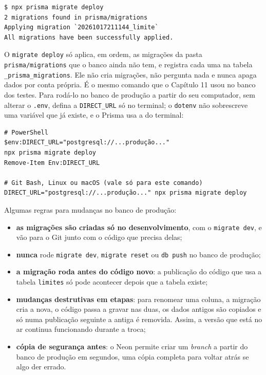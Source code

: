 \begin{codigo}
\begin{Verbatim}[breaklines=true, breaksymbolleft={}, fontsize=\footnotesize]
$ npx prisma migrate deploy
2 migrations found in prisma/migrations
Applying migration `20261017211144_limite`
All migrations have been successfully applied.
\end{Verbatim}
\end{codigo}

O \texttt{migrate deploy} só aplica, em ordem, as migrações da pasta \texttt{prisma/migrations} que o banco ainda não tem, e registra cada uma na tabela \texttt{\_prisma\_migrations}. Ele não cria migrações, não pergunta nada e nunca apaga dados por conta própria. É o mesmo comando que o Capítulo 11 usou no banco dos testes. Para rodá-lo no banco de produção a partir do seu computador, sem alterar o \texttt{.env}, defina a \texttt{DIRECT\_URL} só no terminal; o \texttt{dotenv} não sobrescreve uma variável que já existe, e o Prisma usa a do terminal:

\begin{codigo}
\begin{Verbatim}[breaklines=true, breaksymbolleft={}, fontsize=\footnotesize]
# PowerShell
$env:DIRECT_URL="postgresql://...produção..."
npx prisma migrate deploy
Remove-Item Env:DIRECT_URL

# Git Bash, Linux ou macOS (vale só para este comando)
DIRECT_URL="postgresql://...produção..." npx prisma migrate deploy
\end{Verbatim}
\end{codigo}

Algumas regras para mudanças no banco de produção:

\begin{itemize}
  \item \textbf{as migrações são criadas só no desenvolvimento}, com o \texttt{migrate dev}, e vão para o Git junto com o código que precisa delas;
  \item \textbf{nunca} rode \texttt{migrate dev}, \texttt{migrate reset} ou \texttt{db push} no banco de produção;
  \item \textbf{a migração roda antes do código novo}: a publicação do código que usa a tabela \texttt{limites} só pode acontecer depois que a tabela existe;
  \item \textbf{mudanças destrutivas em etapas}: para renomear uma coluna, a migração cria a nova, o código passa a gravar nas duas, os dados antigos são copiados e só numa publicação seguinte a antiga é removida. Assim, a versão que está no ar continua funcionando durante a troca;
  \item \textbf{cópia de segurança antes}: o Neon permite criar um \textit{branch} a partir do banco de produção em segundos, uma cópia completa para voltar atrás se algo der errado.
\end{itemize}

